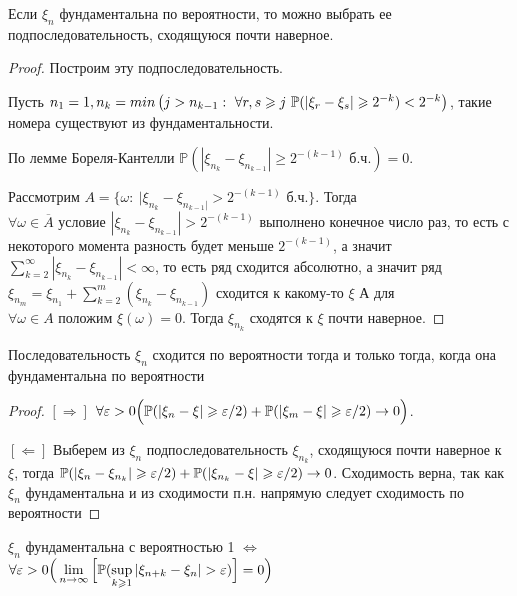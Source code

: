 \begin{lemma}
Если $\xi_n$ фундаментальна по вероятности, то можно выбрать ее подпоследовательность, сходящуюся почти наверное.
\end{lemma}
\begin{proof}
Построим эту подпоследовательность.

Пусть $n_1 = 1, n_k = min\left({j > n_{k - 1}: \ \forall r, s \geqslant j \ \mathbb{P}(|\xi_r - \xi_s| \geqslant 2^{-k}) < 2^{-k}}\right)$, такие номера существуют из фундаментальности.

По лемме Бореля-Кантелли $\mathbb{P}(|\xi_{n_k} - \xi_{n_{k - 1}}| \geqslant 2^{-(k - 1)} \text{ б.ч.}) = 0$. 

Рассмотрим $A = \{\omega : \  |\xi_{n_k} - \xi_{n_{k - 1}|} >  2^{-(k - 1)} \text{ б.ч.}\}$. Тогда $\forall \omega \in \overline{A} \text{ условие } |\xi_{n_k} - \xi_{n_{k - 1}}| >  2^{-(k - 1)}$ выполнено конечное число раз, то есть с некоторого момента разность будет меньше $2^{-(k - 1)}$, а значит $\sum\limits_{k=2}^\infty |\xi_{n_k} - \xi_{n_{k - 1}}| < \infty$, то есть ряд сходится абсолютно, а значит ряд $\xi_{n_m} = \xi_{n_1} + \sum\limits_{k = 2}^m (\xi_{n_k} - \xi_{n_{k-1}}) $ сходится к какому-то $\xi$
А для $\forall \omega \in {A} \text{ положим } \xi(\omega) = 0$. Тогда $\xi_{n_k}$ сходятся к $\xi$ почти наверное. 
\end{proof}

\begin{theorem}
Последовательность $\xi_n$ сходится по вероятности тогда и только тогда, когда она фундаментальна по вероятности
\end{theorem}

\begin{proof}
$[\Longrightarrow]$ $\forall \varepsilon > 0 \Big( \mathbb{P}(|\xi_n - \xi| \geqslant \varepsilon / 2) + \mathbb{P}(|\xi_m - \xi| \geqslant \varepsilon / 2) \to 0 \Big)$.

$[\Longleftarrow]$ Выберем из $\xi_n$ подпоследовательность $\xi_{n_k}$, сходящуюся почти наверное к $\xi$, тогда \newline $\mathbb{P}(|\xi_n - \xi_{n_k}| \geqslant \varepsilon / 2) + \mathbb{P}(|\xi_{n_k} - \xi| \geqslant \varepsilon / 2) \to 0$. Сходимость верна, так как $\xi_n$ фундаментальна и из сходимости п.н. напрямую следует сходимость по вероятности
\end{proof}
\begin{theorem}
$\xi_n$ фундаментальна с вероятностью 1 $\Longleftrightarrow$ \(\mathlarger{\forall \eps > 0 \Big( \lim\limits_{n \to \infty}\Big[ \mathbb{P}(\sup\limits_{k \geqslant 1} |\xi_{n + k} - \xi_n| > \eps) \Big] = 0 \Big)}\)
\end{theorem}

